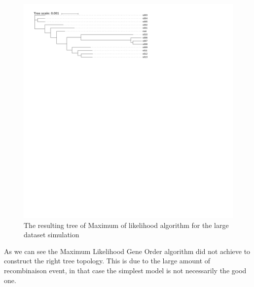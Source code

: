\documentclass[]{article}
\theoremstyle{definition}
\begin{document}
\begin{figure}[H]
	\includegraphics*[width = \linewidth]{image/big_sim_tree_MLGO.pdf}
	\caption{The resulting tree of Maximum of likelihood algorithm for the large dataset simulation }
\end{figure}

As we can see the Maximum Likelihood Gene Order algorithm did not achieve to construct the right tree topology. This is due to the large amount of recombinaison event, in that case the simplest model is not necessarily the good one.
\end{document}
